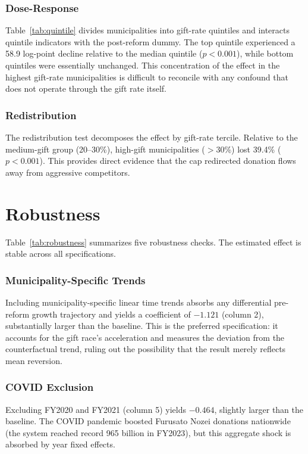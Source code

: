 \documentclass[12pt]{article}
\newcommand{\textyen}{\text{\yen}}
\begin{document}
\subsubsection*{Dose-Response} Table~\ref{tab:quintile} divides municipalities into gift-rate quintiles and interacts quintile indicators with the post-reform dummy. The top quintile experienced a 58.9 log-point decline relative to the median quintile ($p < 0.001$), while bottom quintiles were essentially unchanged. This concentration of the effect in the highest gift-rate municipalities is difficult to reconcile with any confound that does not operate through the gift rate itself.

\subsubsection*{Redistribution} The redistribution test decomposes the effect by gift-rate tercile. Relative to the medium-gift group (20--30\%), high-gift municipalities ($>$30\%) lost 39.4\% ($p < 0.001$). This provides direct evidence that the cap redirected donation flows away from aggressive competitors.

\section{Robustness}

Table~\ref{tab:robustness} summarizes five robustness checks. The estimated effect is stable across all specifications.

\subsubsection*{Municipality-Specific Trends} Including municipality-specific linear time trends absorbs any differential pre-reform growth trajectory and yields a coefficient of $-1.121$ (column 2), substantially larger than the baseline. This is the preferred specification: it accounts for the gift race's acceleration and measures the deviation from the counterfactual trend, ruling out the possibility that the result merely reflects mean reversion.

\subsubsection*{COVID Exclusion} Excluding FY2020 and FY2021 (column 5) yields $-0.464$, slightly larger than the baseline. The COVID pandemic boosted Furusato Nozei donations nationwide (the system reached record \textyen 965 billion in FY2023), but this aggregate shock is absorbed by year fixed effects.
\end{document}
